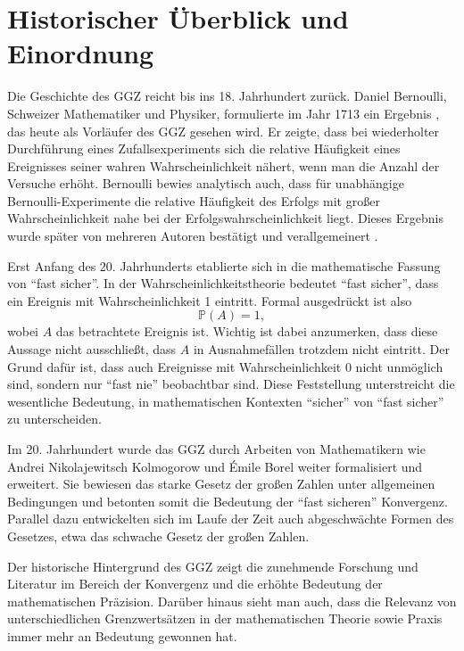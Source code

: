 \documentclass[aodsor,preprint]{imsart}
\numberwithin{equation}{section}
\theoremstyle{plain}
\begin{document}
\section{Historischer Überblick und Einordnung}
\label{sec:hist}
Die Geschichte des GGZ reicht bis ins 18. Jahrhundert zurück.
Daniel Bernoulli, Schweizer Mathematiker und Physiker, formulierte im Jahr 1713 ein Ergebnis \citep{bernoulli1713}, das heute als Vorläufer des GGZ gesehen wird.
Er zeigte, dass bei wiederholter Durchführung eines Zufallsexperiments sich die relative Häufigkeit eines Ereignisses seiner wahren Wahrscheinlichkeit nähert, wenn man die Anzahl der Versuche erhöht.
Bernoulli bewies analytisch auch, dass für unabhängige Bernoulli-Experimente die relative Häufigkeit des Erfolgs mit großer Wahrscheinlichkeit nahe bei der Erfolgswahrscheinlichkeit liegt.
Dieses Ergebnis wurde später von mehreren Autoren bestätigt und verallgemeinert \citep{poisson1837theorie, chebyshev1867}.


Erst Anfang des 20. Jahrhunderts etablierte sich in \citep{borel1909probabilites} die mathematische Fassung von \enquote{fast sicher}.
In der Wahrscheinlichkeitstheorie bedeutet \enquote{fast sicher}, dass ein Ereignis mit Wahrscheinlichkeit 1 eintritt.
Formal ausgedrückt ist also
\[\mathbb{P}(A) = 1,\]
wobei \( A \) das betrachtete Ereignis ist. Wichtig ist dabei anzumerken, dass diese Aussage nicht ausschließt, dass \( A \) in Ausnahmefällen trotzdem nicht eintritt. Der Grund dafür ist, dass auch Ereignisse mit Wahrscheinlichkeit 0 nicht unmöglich sind, sondern nur \enquote{fast nie} beobachtbar sind.
Diese Feststellung unterstreicht die wesentliche Bedeutung, in mathematischen Kontexten \enquote{sicher} von \enquote{fast sicher} zu unterscheiden.


Im 20. Jahrhundert wurde das GGZ durch Arbeiten von Mathematikern wie  Andrei Nikolajewitsch Kolmogorow und Émile Borel weiter formalisiert und erweitert.
Sie bewiesen das starke Gesetz der großen Zahlen unter allgemeinen Bedingungen und betonten somit die Bedeutung der \enquote{fast sicheren} Konvergenz.
Parallel dazu entwickelten sich im Laufe der Zeit auch abgeschwächte Formen des Gesetzes, etwa das schwache Gesetz der großen Zahlen.


Der historische Hintergrund des GGZ zeigt die zunehmende Forschung und Literatur im Bereich der Konvergenz und die erhöhte Bedeutung der mathematischen Präzision. Darüber hinaus sieht man auch, dass die Relevanz von unterschiedlichen Grenzwertsätzen in der mathematischen Theorie sowie Praxis immer mehr an Bedeutung gewonnen hat.
\end{document}

